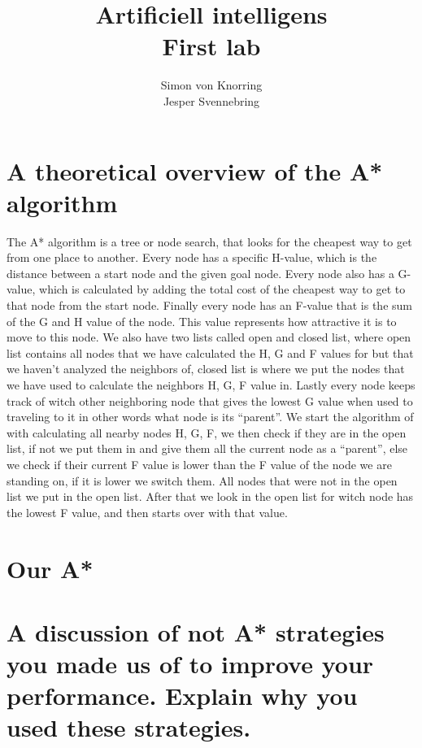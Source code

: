 \documentclass[12pt, a4paper]{article}
\title{Artificiell intelligens\\First lab}
\author{Simon von Knorring\\Jesper Svennebring}
\begin{document}
\maketitle

\newpage
\section{A theoretical overview of the A* algorithm}
The A* algorithm is a tree or node search, that looks for the cheapest way to get from one place to another.
Every node has a specific H-value, which is the distance between a start node and the given goal node.
Every node also has a G-value, which is calculated by adding the total cost of the cheapest way to get to that node from the start node.
Finally every node has an F-value that is the sum of the G and H value of the node. This value represents how attractive it is to move to this node.
We also have two lists called open and closed list, where open list contains all nodes that we have calculated the H, G and F values for but that we haven’t analyzed the neighbors of, closed list is where we put the nodes that we have used to calculate the neighbors H, G, F value in.
Lastly every node keeps track of witch other neighboring node that gives the lowest G value when used to traveling to it in other words what node is its “parent”. 
We start the algorithm of with calculating all nearby nodes H, G, F, we then check if they are in the open list, if not we put them in and give them all the current node as a “parent”, else we check if their current F value is lower than the F value of the node we are standing on, if it is lower we switch them. All nodes that were not in the open list we put in the open list. After that we look in the open list for witch node has the lowest F value, and then starts over with that value. 


\section{Our A*}



\section{A discussion of not A* strategies you made us of to improve your performance. Explain why you used these strategies.}
\end{document}
